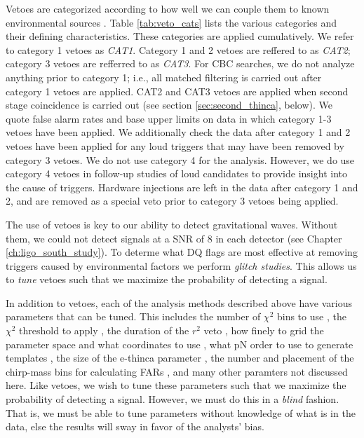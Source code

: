 Vetoes are categorized according to how well we can couple them to known
environmental sources \cite{Slutsky:2010ff, Christensen:2010}. Table
\ref{tab:veto_cats} lists the various categories and their defining
characteristics. These categories are applied cumulatively. We refer to
category 1 vetoes as \emph{CAT1}. Category 1 and 2 vetoes are reffered to as
\emph{CAT2}; category 3 vetoes are refferred to as \emph{CAT3}. For \ac{CBC}
searches, we do not analyze anything prior to category 1; i.e., all matched
filtering is carried out after category 1 vetoes are applied. CAT2 and CAT3
vetoes are applied when second stage coincidence is carried out (see section
\ref{sec:second_thinca}, below). We quote false alarm rates and base upper
limits on data in which category 1-3 vetoes have been applied. We additionally
check the data after category 1 and 2 vetoes have been applied for any loud
triggers that may have been removed by category 3 vetoes. We do not use
category 4 for the analysis.  However, we do use category 4 vetoes in follow-up
studies of loud candidates to provide insight into the cause of triggers.
Hardware injections are left in the data after category 1 and 2, and are
removed as a special veto prior to category 3 vetoes being applied.

The use of vetoes is key to our ability to detect gravitational waves. Without
them, we could not detect signals at a \ac{SNR} of $8$ in each detector (see
Chapter \ref{ch:ligo_south_study}). To determe what \ac{DQ} flags are most
effective at removing triggers caused by environmental factors we perform
\emph{glitch studies}. This allows us to \emph{tune} vetoes such that we
maximize the probability of detecting a signal.

In addition to vetoes, each of the analysis methods described above have
various parameters that can be tuned. This includes the number of $\chi^2$ bins
to use \cite{Brown}, the $\chi^2$ threshold to apply \cite{Keppel:thesis}, the
duration of the $r^2$ veto \cite{Rodriguez:2007}, how finely to grid the
parameter space and what coordinates to use \cite{Owen:1998dk, Tanaka:2000,
BBCCS:2006, hexabank}, what \ac{pN} order to use to generate templates
\cite{Collaboration:2009tt, Abbott:2009qj, Collaboration:S6CBClowmass}, the
size of the e-thinca parameter \cite{Robinson:2008, Keppel:thesis}, the number
and placement of the chirp-mass bins for calculating \acp{FAR}
\cite{Keppel:thesis}, and many other paramters not discussed here. Like vetoes,
we wish to tune these parameters such that we maximize the probability of
detecting a signal. However, we must do this in a {\it blind} fashion. That is,
we must be able to tune parameters without knowledge of what is in the data,
else the results will sway in favor of the analysts' bias.

